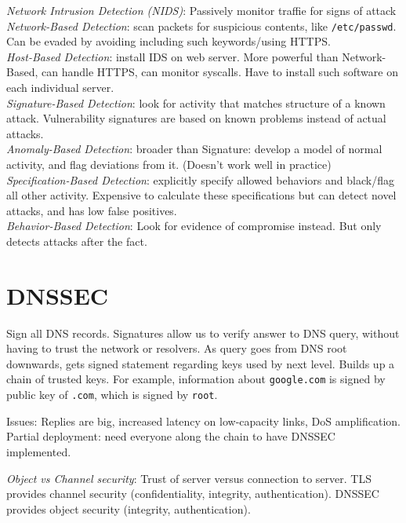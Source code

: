 \documentclass[10pt,landscape]{article}
\begin{document}
\begin{multicols}{3}
\textit{Network Intrusion Detection (NIDS)}: Passively monitor traffie for signs of attack \\
\textit{Network-Based Detection}: scan packets for suspicious contents, like \texttt{/etc/passwd}. Can be evaded by avoiding including such keywords/using HTTPS. \\
\textit{Host-Based Detection}: install IDS on web server. More powerful than Network-Based, can handle HTTPS, can monitor syscalls. Have to install such software on each individual server. \\
\textit{Signature-Based Detection}: look for activity that matches structure of a known attack. Vulnerability signatures are based on known problems instead of actual attacks. \\
\textit{Anomaly-Based Detection}: broader than Signature: develop a model of normal activity, and flag deviations from it. (Doesn't work well in practice) \\
\textit{Specification-Based Detection}: explicitly specify allowed behaviors and black/flag all other activity. Expensive to calculate these specifications but can detect novel attacks, and has low false positives. \\
\textit{Behavior-Based Detection}: Look for evidence of compromise instead. But only detects attacks after the fact.


\section{DNSSEC}

Sign all DNS records. Signatures allow us to verify answer to DNS query, without having to trust the network or resolvers. As query goes from DNS root downwards, gets signed statement regarding keys used by next level. Builds up a chain of trusted keys. For example, information about \texttt{google.com} is signed by public key of \texttt{.com}, which is signed by \texttt{root}.

Issues: Replies are big, increased latency on low-capacity links, DoS amplification. Partial deployment: need everyone along the chain to have DNSSEC implemented.

\textit{Object vs Channel security}: Trust of server versus connection to server. TLS provides channel security (confidentiality, integrity, authentication). DNSSEC provides object security (integrity, authentication).


\end{multicols}
\end{document}
